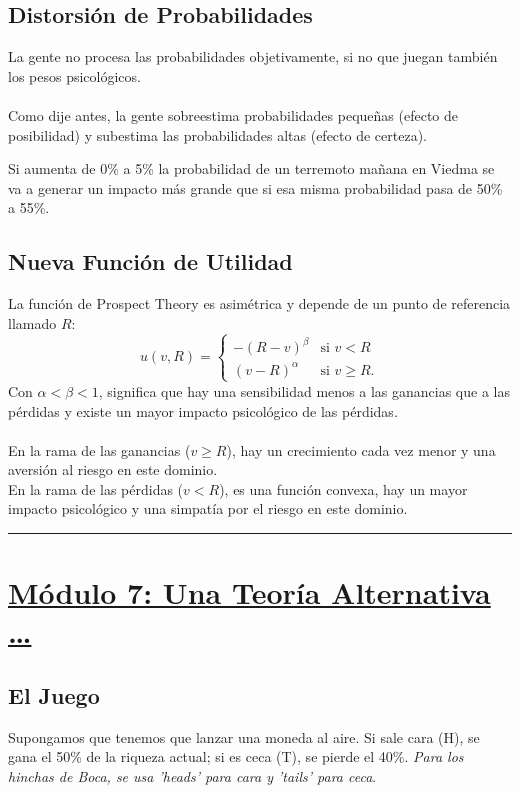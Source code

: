 \documentclass{article}
\newcommand*\sepline{%
  \begin{center}
    \rule[1ex]{.5\textwidth}{.5pt}
  \end{center}}
\begin{document}
        \subsection*{Distorsión de Probabilidades}
            La gente no procesa las probabilidades objetivamente, si no que juegan también los pesos psicológicos. \\
            \\
            Como dije antes, la gente sobreestima probabilidades pequeñas (efecto de posibilidad) y subestima las probabilidades altas (efecto de certeza).

            Si aumenta de 0\% a 5\% la probabilidad de un terremoto mañana en Viedma se va a generar un impacto más grande que si esa misma probabilidad pasa de 50\% a 55\%.
        \subsection*{Nueva Función de Utilidad}
            La función de Prospect Theory es asimétrica y depende de un punto de referencia llamado $R$: \\
            \[
                u(v, R) =
                \begin{cases} 
                  -(R - v)^{\beta} & \text{si } v < R \\ 
                  (v-R)^{\alpha} & \text{si } v \geq R.
                \end{cases}
            \]
            Con $\alpha < \beta < 1$, significa que hay una sensibilidad menos a las ganancias que a las pérdidas y existe un mayor impacto psicológico de las pérdidas. \\
            \\
            En la rama de las ganancias ($v \geq R$), hay un crecimiento cada vez menor y una aversión al riesgo en este dominio. \\
            En la rama de las pérdidas ($v < R$), es una función convexa, hay un mayor impacto psicológico y una simpatía por el riesgo en este dominio. \\

    \sepline

    \section*{\underline{Módulo 7: Una Teoría Alternativa \ldots}}
        \subsection*{El Juego}
            Supongamos que tenemos que lanzar una moneda al aire. Si sale cara (H), se gana el 50\% de la riqueza actual; si es ceca (T), se pierde el 40\%. \textit{Para los hinchas de Boca, se usa 'heads' para cara y 'tails' para ceca}.
\end{document}
